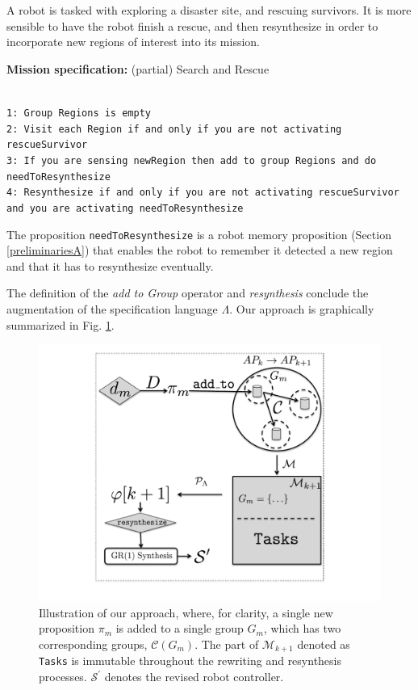 \begin{myExample}\label{Ex:SnS} A robot is tasked with exploring a disaster site, and rescuing survivors. It is more sensible to have the robot finish a rescue, and then resynthesize in order to incorporate new regions of interest into its mission.
	\begin{algorithm}
	\textbf{Mission specification:} (partial) Search and Rescue
	
	\vspace{-6 pt}
	\hrulefill\\
	{\small
	\texttt{1: Group Regions is empty}\\
	\texttt{2: Visit each Region if and only if you are not activating rescueSurvivor}\\
	\texttt{3: If you are sensing newRegion then add to group Regions and do needToResynthesize}\\	
	\texttt{4: Resynthesize if and only if you are not activating rescueSurvivor and you are activating needToResynthesize}\\
	}
	\vspace{-10 pt}
	\end{algorithm}
	
The proposition \texttt{needToResynthesize} is a robot memory proposition (Section \ref{preliminariesA}) that enables the robot to remember it detected a new region and that it has to resynthesize eventually.
\end{myExample}

The definition of the \emph{add to Group} operator and \emph{resynthesis} conclude the augmentation of the specification language $\Lambda$. Our approach is graphically summarized in Fig. \ref{Fig:approach}.

\begin{figure}[h]
	\centering
	\includegraphics[width=0.9\columnwidth, clip]{./img/approach.pdf}
	\caption{Illustration of our approach, where, for clarity, a single new proposition $\pi_{m}$ is added to a single group $G_m$, which has two corresponding groups, $\mathcal{C}(G_m)$. The part of $\mathcal{M}_{k+1}$ denoted as \texttt{Tasks} is immutable throughout the rewriting and resynthesis processes. $\mathcal{S}^\prime$ denotes the revised robot controller.} %
	\label{Fig:approach}
\end{figure}
